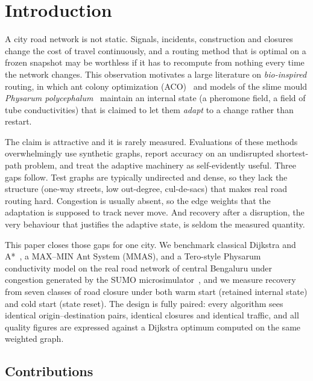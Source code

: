 \section{Introduction}

A city road network is not static. Signals, incidents, construction and
closures change the cost of travel continuously, and a routing method that is
optimal on a frozen snapshot may be worthless if it has to recompute from
nothing every time the network changes. This observation motivates a large
literature on \emph{bio-inspired} routing, in which ant colony optimization
(ACO)~\cite{dorigo1996ant,stutzle2000maxmin} and models of the slime mould
\emph{Physarum polycephalum}~\cite{nakagaki2000maze,tero2007mathematical}
maintain an internal state (a pheromone field, a field of tube
conductivities) that is claimed to let them \emph{adapt} to a change
rather than restart.

The claim is attractive and it is rarely measured. Evaluations of these
methods overwhelmingly use synthetic graphs, report accuracy on an
undisrupted shortest-path problem, and treat the adaptive machinery as
self-evidently useful. Three gaps follow. Test graphs are typically
undirected and dense, so they lack the structure (one-way streets, low out-degree, cul-de-sacs)
that makes real road routing hard. Congestion is
usually absent, so the edge weights that the adaptation is supposed to track
never move. And recovery after a disruption, the very behaviour that
justifies the adaptive state, is seldom the measured quantity.

This paper closes those gaps for one city. We benchmark classical Dijkstra and
A*~\cite{dijkstra1959note,hart1968formal}, a MAX--MIN Ant System (MMAS), and
a Tero-style Physarum conductivity model on the real road network of central Bengaluru under congestion generated by
the SUMO microsimulator~\cite{lopez2018microscopic}, and we measure recovery
from seven classes of road closure under both warm start (retained internal
state) and cold start (state reset). The design is fully paired: every
algorithm sees identical origin--destination pairs, identical closures and
identical traffic, and all quality figures are expressed against a Dijkstra
optimum computed on the same weighted graph.

\subsection{Contributions}

